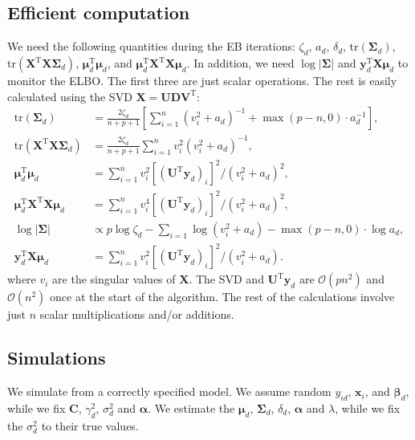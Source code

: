 \documentclass[a4paper,hidelinks]{article}\usepackage[]{graphicx}\usepackage[]{color}
\newcommand{\X}{\mathbf{X}}
\newcommand{\x}{\mathbf{x}}
\newcommand{\0}{\bm{0}}
\newcommand{\tr}{^{\text{T}}}
\newcommand{\trace}{\text{tr}}
\renewcommand{\(}{\left(}
\renewcommand{\)}{\right)}
\renewcommand{\[}{\left[}
\renewcommand{\]}{\right]}
\begin{document}
\begin{appendix}
		\subsection{Efficient computation}
		We need the following quantities during the EB iterations: $\zeta_d$, $a_d$, $\delta_d$, $\trace (\bm{\Sigma}_d)$, $\trace (\X \tr \X \bm{\Sigma}_d)$, $\bm{\mu}_d \tr \bm{\mu}_d$, and $\bm{\mu}_d \tr \X \tr \X \bm{\mu}_d$. In addition, we need $\log|\bm{\Sigma}|$ and $\mathbf{y}_d \tr \X \bm{\mu}_d$ to monitor the ELBO. The first three are just scalar operations. The rest is easily calculated using the SVD $\X = \mathbf{U} \mathbf{D} \mathbf{V} \tr$:
		\begin{align*}
		\trace (\bm{\Sigma}_d) & = \frac{2\zeta_d}{n + p + 1} \[\sum_{i=1}^n (v_i^2 + a_d)^{-1} + \max (p - n, 0)\cdot a_d^{-1}\], \\
		\trace (\X \tr \X \bm{\Sigma}_d) & = \frac{2\zeta_d}{n + p + 1} \sum_{i=1}^n v_i^2(v_i^2 + a_d)^{-1}, \\
		\bm{\mu}_d \tr \bm{\mu}_d & = \sum_{i=1}^n v_i^2 [(\mathbf{U} \tr \mathbf{y}_d)_i]^2/(v_i^2 + a_d)^2, \\
		\bm{\mu}_d \tr \X \tr \X \bm{\mu}_d & = \sum_{i=1}^n v_i^4 [(\mathbf{U} \tr \mathbf{y}_d)_i]^2/(v_i^2 + a_d)^2, \\
		\log|\bm{\Sigma}| & \propto p \log \zeta_d - \sum_{i=1} \log (v_i^2 + a_d) - \max(p - n, 0) \cdot \log a_d, \\
		\mathbf{y}_d \tr \X \bm{\mu}_d & = \sum_{i=1}^n v_i^2 [(\mathbf{U} \tr \mathbf{y}_d)_i]^2/(v_i^2 + a_d).
		\end{align*}
		where $v_i$ are the singular values of $\X$. The SVD and $\mathbf{U} \tr \mathbf{y}_d$ are $\mathcal{O}(pn^2)$ and $\mathcal{O}(n^2)$ once at the start of the algorithm. The rest of the calculations involve just $n$ scalar multiplications and/or additions. 
		
		\subsection{Simulations}
		We simulate from a correctly specified model. We assume random $y_{id}$, $\x_i$, and $\bm{\beta}_d$, while we fix $\mathbf{C}$, $\gamma_d^2$, $\sigma_d^2$ and $\bm{\alpha}$. We estimate the $\bm{\mu}_d$, $\bm{\Sigma}_d$, $\delta_d$, $\bm{\alpha}$ and $\lambda$, while we fix the $\sigma_d^2$ to their true values.
		

\end{appendix}
\end{document}
